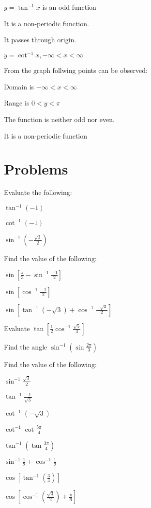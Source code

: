    \item $y = \tan^{-1}x$ is an odd function

   \item It is a non-periodic function.

   \item It passes through origin.
   \stopitemize
 \item $y = \cot^{-1}x, -\infty< x <\infty$
  \startplacefigure[title={}]
    \externalfigure[25_4.pdf]
  \stopplacefigure

   From the graph follwing points can be observed:
   \startitemize[n]
   \item Domain is $-\infty < x < \infty$

   \item Range is $0<y<\pi$

   \item The function is neither odd nor even.

   \item It is a non-periodic function
   \stopitemize
\stopitemize

\section{Problems}
Evaluate the following:
\startitemize[n, 1*broad]
\item $\tan^{-1}(-1)$
\item $\cot^{-1}(-1)$
\item $\sin^{-1}\left(-\frac{\sqrt{3}}{2}\right)$

Find the value of the following:

\item $\sin\left[\frac{\pi}{3} - \sin^{-1}\frac{-1}{2}\right]$
\item $\sin\left[\cos^{-1}\frac{-1}{2}\right]$
\item $\sin\left[\tan^{-1}(-\sqrt{3}) + \cos^{-1}\frac{-\sqrt{3}}{2}\right]$
\item Evaluate $\tan\left[\frac{1}{2}\cos^{-1}\frac{\sqrt{5}}{3}\right]$
\item Find the angle $\sin^{-1}\left(\sin\frac{2\pi}{3}\right)$

Find the value of the following:

\item $\sin^{-1}\frac{\sqrt{3}}{2}$
\item $\tan^{-1}\frac{-1}{\sqrt{3}}$
\item $\cot^{-1}(-\sqrt{3})$
\item $\cot^{-1}\cot\frac{5\pi}{4}$
\item $\tan^{-1}\left(\tan\frac{3\pi}{4}\right)$
\item $\sin^{-1}\frac{1}{2} + \cos^{-1}\frac{1}{2}$
\item $\cos\left[\tan^{-1}\left(\frac{3}{4}\right)\right]$
\item $\cos\left[\cos^{-1}\left(\frac{\sqrt{3}}{2}\right) + \frac{\pi}{6}\right]$

